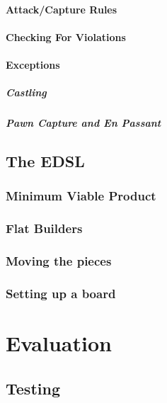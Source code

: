 \documentclass[12pt, a4paper, bibliography=totocnumbered]{scrreprt}
\begin{document}
\subsubsection{Attack/Capture Rules}

\subsubsection{Checking For Violations}

\subsubsection{Exceptions}

\paragraph{Castling}

\paragraph{Pawn Capture and En Passant}

\section{The EDSL}

\subsection{Minimum Viable Product}

\subsection{Flat Builders}

\subsection{Moving the pieces}

\subsection{Setting up a board}


\chapter{Evaluation}

\section{Testing}
\end{document}
